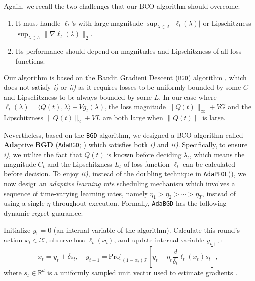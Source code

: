 \documentclass[11pt,fullpage,letterpaper]{article} %
\renewcommand{\bm}[1]{#1}%
\newcommand{\OLOAlg}{\texttt{AdaPFOL}\xspace}
\newcommand{\BCOAlg}{\texttt{AdaBGD}\xspace}
\begin{document}
Again, we recall the two challenges that our BCO algorithm should overcome:
\begin{enumerate}
\item[\textit{i)}] It must handle $\ell_t$'s with large magnitude $\sup_{\bm \lambda\in \Lambda} \lvert \ell_t(\bm \lambda)\rvert$ or Lipschitzness $\sup_{\bm \lambda\in \Lambda} \lVert \nabla \ell_t(\bm \lambda)\rVert_2$.
\item[\textit{ii)}] Its performance should depend on magnitudes and Lipschitzness of all loss functions.
\end{enumerate}


Our algorithm is based on the Bandit Gradient Descent (\texttt{BGD}) algorithm \citep[Algorithm 1]{zhao2021bandit}, which does not satisfy \textit{i)} or \textit{ii)} as it requires losses to be uniformly bounded by some $C$ and Lipschitzness to be always bounded by some $L$.
In our case where $\ell_t(\bm \lambda)=\langle \bm Q(t),\bm \lambda\rangle-Vg_t(\bm \lambda)$, the loss magnitude $\lVert \bm Q(t)\rVert_\infty + VG$ and the Lipschitzness $\lVert \bm Q(t)\rVert_2+VL$ are both large when $\lVert \bm Q(t)\rVert$ is large.

Nevertheless, based on the \texttt{BGD} algorithm, we designed a BCO algorithm called \textbf{Ada}ptive \textbf{BGD} (\BCOAlg; ) which satisfies both \textit{i)} and \textit{ii)}.
Specifically, to ensure \textit{i)}, we utilize the fact that $\bm Q(t)$ is known before deciding $\bm \lambda_t$, which means the magnitude $C_t$ and the Lipschitzness $L_t$ of loss function $\ell_t$ can be calculated before decision. To enjoy \textit{ii)}, instead of the doubling technique in \OLOAlg (), we now design an \textit{adaptive learning rate} scheduling mechanism which involves a sequence of time-varying learning rates, namely $\eta_1>\eta_2>\cdots>\eta_T$, instead of using a single $\eta$ throughout execution.
Formally, \BCOAlg has the following dynamic regret guarantee:
\begin{algorithm}[t!]
\caption{\BCOAlg: \textbf{A}daptive \textbf{B}andit \textbf{G}radient \textbf{D}escent}
\label{alg:ABGD}
\begin{algorithmic}[1]
\STATE Initialize $\bm y_1=\bm 0$ (an internal variable of the algorithm).
\STATE Calculate this round's action $\bm x_t\in \mathcal X$, observe loss $\ell_t(x_t)$, and update internal variable $\bm y_{t+1}$:
\begin{equation}\label{eq:ABGD}
\bm x_t=\bm y_t+\delta \bm s_t,\quad \bm y_{t+1}=\text{Proj}_{(1-\alpha_t)\mathcal X}\left [\bm y_t-\eta_t \frac{d}{\delta_t} \ell_t(\bm x_t) \bm s_t\right ],
\end{equation}
where $\bm s_t\in \mathbb R^d$ is a uniformly sampled unit vector used to estimate gradients \citep{flaxman2005online}.
\ENDFOR
\end{algorithmic}
\end{algorithm}
\end{document}
